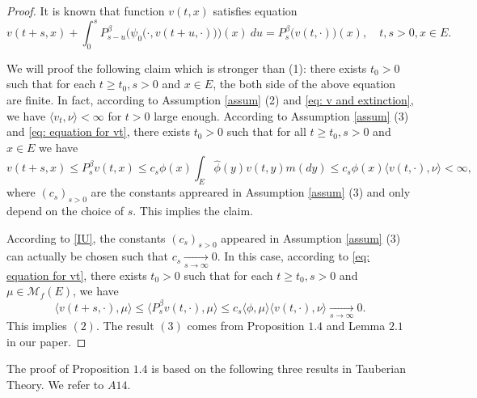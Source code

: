 \documentclass[12pt,a4paper]{amsart}
\numberwithin{equation}{section}
\theoremstyle{plain}
\theoremstyle{definition}
\theoremstyle{remark}
\begin{document}
\begin{proof}
It is known that function $v(t,x)$ satisfies equation
\begin{equation}
\label{eq: equation for vt}
	v(t+s,x) + \int_0^sP^\beta_{s-u}\Big(\psi_0\big(\cdot, v(t+u,\cdot)\big)\Big)(x)~du
	=P^\beta_s\big(v(t,\cdot)\big)(x),
	\quad t,s > 0, x\in E.
\end{equation}

	We will proof the following claim which is stronger than (1): there exists $t_0 >0$ such that for each $t\geq t_0, s> 0$ and $x \in E$, the both side of the above equation are finite.
	In fact, according to Assumption \ref{assum} (2) and \eqref{eq: v and extinction}, we have $\langle v_t, \nu\rangle < \infty $ for $t>0$ large enough.
	According to Assumption \ref{assum} (3) and \eqref{eq: equation for vt}, there exists $t_0>0$ such that for all $t \geq t_0,s>0$ and $x\in E$ we have
\begin{equation}
\label{upp}
	v(t+s,x) \leq P^{\beta}_sv(t,x)\leq c_s\phi(x)\int_E\hat\phi(y)v(t,y)m(dy)\leq c_s\phi(x)\langle v(t,\cdot),\nu\rangle< \infty,
\end{equation}
	where $(c_s)_{s>0}$ are the constants appreared in Assumption \ref{assum} (3) and only depend on the choice of $s$.
	This implies the claim.

	According to \eqref{IU}, the constants $(c_s)_{s>0}$ appeared in Assumption \ref{assum} (3) can actually be chosen such that $c_s \xrightarrow[s\to \infty]{} 0$.
	In this case, according to \eqref{eq: equation for vt}, there exists $t_0>0$ such that for each $t \geq t_0, s>0$ and $\mu \in \mathcal M_f(E)$, we have
\[
	\langle v(t +s,\cdot),\mu\rangle
	\leq  \langle P^\beta_sv(t,\cdot),\mu\rangle
	\leq  c_s\langle \phi,\mu\rangle \langle v(t,\cdot), \nu \rangle
	\xrightarrow[s\to \infty]{} 0.
\]
	This implies $(2)$.  The result $(3)$ comes from Proposition $1.4$ and Lemma $2.1$ in our paper.
\end{proof}
The proof of Proposition $1.4$ is based on the following three results in Tauberian Theory.  We refer to \cite{AH} $A14$.
\end{document}
